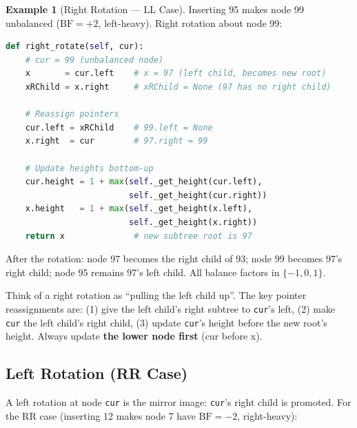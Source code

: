 \documentclass[11pt, a4paper, notitlepage]{report}
\theoremstyle{definition}
\theoremstyle{remark}
\theoremstyle{definition}
\newtheorem{example}[theorem]{Example}
\begin{document}
\begin{example}[Right Rotation --- LL Case]
\label{ex:right-rotate}
Inserting 95 makes node 99 unbalanced ($\text{BF} = +2$, left-heavy).  Right rotation
about node 99:

\begin{lstlisting}[language=Python]
def right_rotate(self, cur):
    # cur = 99 (unbalanced node)
    x       = cur.left    # x = 97 (left child, becomes new root)
    xRChild = x.right     # xRChild = None (97 has no right child)

    # Reassign pointers
    cur.left = xRChild    # 99.left = None
    x.right  = cur        # 97.right = 99

    # Update heights bottom-up
    cur.height = 1 + max(self._get_height(cur.left),
                         self._get_height(cur.right))
    x.height   = 1 + max(self._get_height(x.left),
                         self._get_height(x.right))
    return x              # new subtree root is 97
\end{lstlisting}

After the rotation: node 97 becomes the right child of 93; node 99 becomes 97's right
child; node 95 remains 97's left child.  All balance factors in $\{-1,0,1\}$.
\end{example}

\begin{examtip}[title={Exam Tip: Right Rotation Mnemonic}]
Think of a right rotation as ``pulling the left child up''.  The key pointer reassignments
are: (1) give the left child's right subtree to \texttt{cur}'s left, (2) make \texttt{cur}
the left child's right child, (3) update \texttt{cur}'s height before the new root's height.
Always update \textbf{the lower node first} (cur before x).
\end{examtip}

\subsection{Left Rotation (RR Case)}
\label{subsec:left-rotation}

A left rotation at node \texttt{cur} is the mirror image: \texttt{cur}'s right child is
promoted.  For the RR case (inserting 12 makes node 7 have $\text{BF} = -2$, right-heavy):
\end{document}
